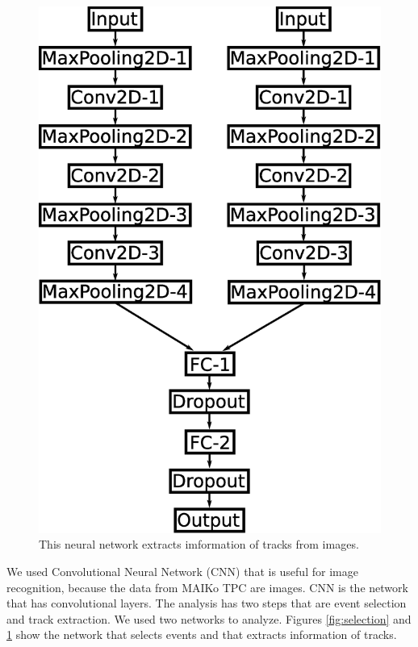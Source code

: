 \documentclass{jps-cp}
\begin{document}
\begin{figure}
\begin{minipage}{0.4\columnwidth}
    \includegraphics[clip, width=0.9\columnwidth]{eps/point_detection.eps}
    \caption{This neural network extracts imformation of tracks from images.}
    \label{fig:extraction}
  \end{minipage}
\end{figure}

We used Convolutional Neural Network (CNN) that is useful for image recognition,
because the data from MAIKo TPC are images.
CNN is the network that has convolutional layers.
The analysis has two steps that are event selection and track extraction.
We used two networks to analyze.
Figures \ref{fig:selection} and \ref{fig:extraction} show
the network that selects events and that extracts information of tracks.
\end{document}
